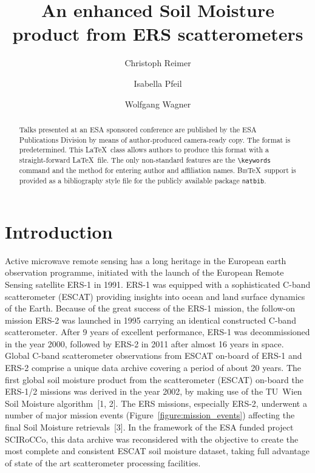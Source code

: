\documentclass[a4paper,twocolumn]{esapub2005} %
\title{An enhanced Soil Moisture product from ERS scatterometers}
\author{Christoph Reimer}
\author{Isabella Pfeil}
\author{Wolfgang Wagner}
\affil{TU Wien, Department of Geodesy and Geoinformation, Research Group Remote Sensing}
\newcommand{\btx}{\textsc{Bib}\TeX}
\begin{document}
\maketitle

\begin{abstract}
Talks presented at an ESA sponsored conference are published by the ESA
Publications Division by means of author-produced camera-ready copy. The
format is predetermined. This \LaTeX\ class allows authors to produce
this format with a straight-forward \LaTeX\ file. The only non-standard
features are the \verb!\keywords! command and the method for entering
author and affiliation names. \btx\ support is provided as a bibliography
style file for the publicly available package \texttt{natbib}.
\end{abstract}


\section{Introduction}
Active microwave remote sensing has a long heritage in the European earth observation programme, initiated with the launch of the European Remote Sensing satellite ERS-1 in 1991.
ERS-1 was equipped with a sophisticated C-band scatterometer (ESCAT) providing insights into ocean and land surface dynamics of the Earth.
Because of the great success of the ERS-1 mission, the follow-on mission ERS-2 was launched in 1995 carrying an identical constructed C-band scatterometer.
After 9 years of excellent performance, ERS-1 was decommissioned in the year 2000, followed by ERS-2 in 2011 after almost 16 years in space.
Global C-band scatterometer observations from ESCAT on-board of ERS-1 and ERS-2 comprise a unique data archive covering a period of about 20 years.
The first global soil moisture product from the scatterometer (ESCAT) on-board the ERS-1/2 missions was derived in the year 2002, by making use of the TU~Wien Soil Moisture algorithm~[1, 2].
The ERS missions, especially ERS-2, underwent a number of major mission events (Figure~\ref{figure:mission_events}) affecting the final Soil Moisture retrievals~[3].
In the framework of the ESA funded project SCIRoCCo, this data archive was reconsidered with the objective to create the most complete and consistent ESCAT soil moisture dataset, taking full advantage of state of the art scatterometer processing facilities.
 
\end{document}
